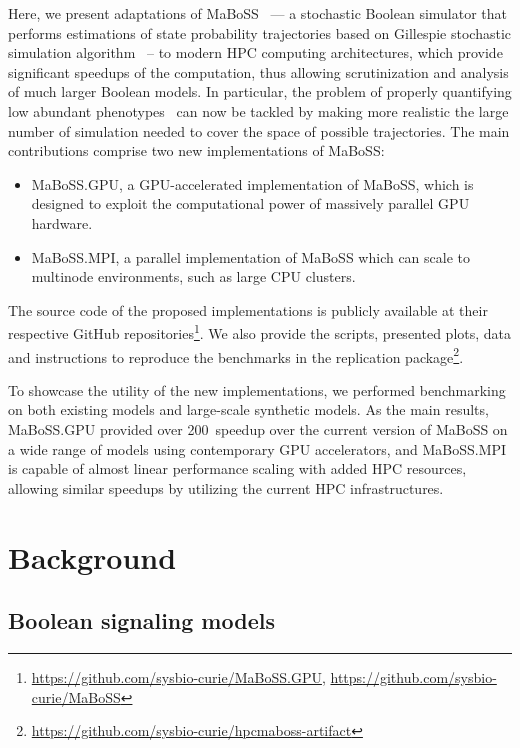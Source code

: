 \documentclass[sn-mathphys-num]{sn-jnl}%
\begin{document}
Here, we present adaptations of MaBoSS~\cite{stoll2012continuous, stoll2017maboss} --- a stochastic Boolean simulator that performs estimations of state probability trajectories based on Gillespie stochastic simulation algorithm~\cite{gillespie1976general} -- to modern HPC computing architectures, which provide significant speedups of the computation, thus allowing scrutinization and analysis of much larger Boolean models. In particular, the problem of properly quantifying low abundant phenotypes~\cite{gillespie2013perspective} can now be tackled by making more realistic the large number of simulation needed to cover the space of possible trajectories.
The main contributions comprise two new implementations of MaBoSS:
\begin{itemize}
    \item MaBoSS.GPU, a GPU-accelerated implementation of MaBoSS, which is designed to exploit the computational power of massively parallel GPU hardware.
    \item MaBoSS.MPI, a parallel implementation of MaBoSS which can scale to multinode environments, such as large CPU clusters.
\end{itemize}

The source code of the proposed implementations is publicly available at their respective GitHub repositories\footnote{\url{https://github.com/sysbio-curie/MaBoSS.GPU}, \url{https://github.com/sysbio-curie/MaBoSS}}. We also provide the scripts, presented plots, data and instructions to reproduce the benchmarks in the replication package\footnote{\url{https://github.com/sysbio-curie/hpcmaboss-artifact}}.

To showcase the utility of the new implementations, we performed benchmarking on both existing models and large-scale synthetic models. As the main results, MaBoSS.GPU provided over 200\texttimes\ speedup over the current version of MaBoSS on a wide range of models using contemporary GPU accelerators, and MaBoSS.MPI is capable of almost linear performance scaling with added HPC resources, allowing similar speedups by utilizing the current HPC infrastructures.

\section{Background}

\subsection{Boolean signaling models}
\end{document}
